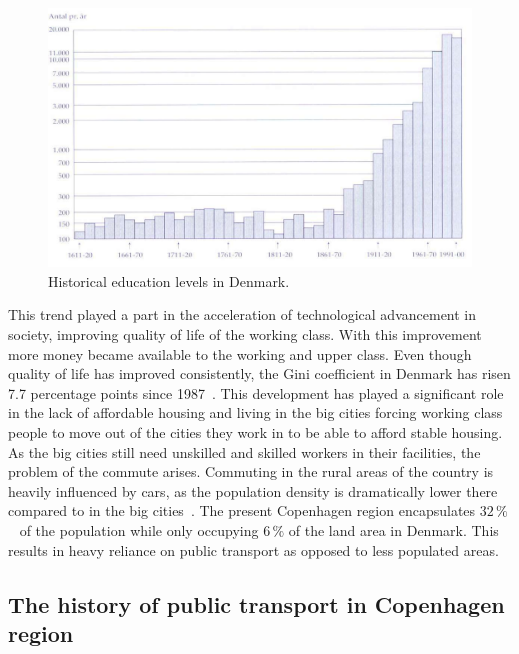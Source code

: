 \begin{figure}
    \centering
    \includegraphics[width=\textwidth]{images/education-levels}
    \caption{Historical education levels in Denmark.}
    \label{fig:figure5}
\end{figure}

This trend played a part in the acceleration of technological advancement in society, improving quality of life of the
working class.
With this improvement more money became available to the working and upper class.
Even though quality of life has improved consistently, the Gini coefficient in Denmark has risen 7.7 percentage points
since 1987~\cite{cepos2023}.
This development has played a significant role in the lack of affordable housing and living in the big cities forcing
working class people to move out of the cities they work in to be able to afford stable housing.
As the big cities still need unskilled and skilled workers in their facilities, the problem of the commute arises.
Commuting in the rural areas of the country is heavily influenced by cars, as the population density is dramatically
lower there compared to in the big cities~\cite{mulacic2020}.
The present Copenhagen region encapsulates \(32\,\%\)~\cite{statistikbanken2023} of the
population while only occupying \(6\,\%\) of the land area in Denmark.
This results in heavy reliance on public transport as opposed to less populated areas.

\subsection{The history of public transport in Copenhagen region}
\label{subsec:the-history-of-public-transport-in-copenhagen-region}

